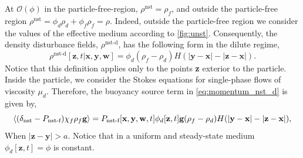 At $\mathcal{O}(\phi)$ in the particle-free-region, $\rho^\text{nst} = \rho_f$, and outside the particle-free region $\rho^\text{nst} = \phi_d\rho_d + \phi_f\rho_f= \rho$.
Indeed, outside the particle-free region we consider the values of the effective medium according to \ref{fig:unst}. 
Consequently, the density disturbance fields, $\rho^\text{nst-d}$, has the following form in the dilute regime, 
\begin{equation*}
    \rho^\text{nst-d}[\textbf{z},t|\textbf{x},\textbf{y},\textbf{w}]
    = \phi_d (\rho_f - \rho_d) H(|\textbf{y} - \textbf{x}| - |\textbf{z} - \textbf{x}|).
\end{equation*}
Notice that this definition applies only to the points \textbf{z} exterior to the particle. 
Inside the particle, we consider the Stokes equations for single-phase flows of viscosity $\mu_d$. 
Therefore, the buoyancy source term in \ref{eq:momentum_nst_d} is given by, 
\begin{equation*}
    \left<(\delta_\text{nst} - P_\text{nst-f}) \chi_f \rho_f \textbf{g}\right>
    = 
    P_\text{nst-f} [\textbf{x},\textbf{y},\textbf{w},t]
    \phi_d[\textbf{z},t] 
    \textbf{g}
    (\rho_f - \rho_d) H(|\textbf{y} - \textbf{x}| - |\textbf{z} - \textbf{x}|), 
\end{equation*}
When $|\textbf{z} - \textbf{y}| > a$. 
Notice that in a uniform and steady-state medium $\phi_d[\textbf{z},t] = \phi$ is constant. 


